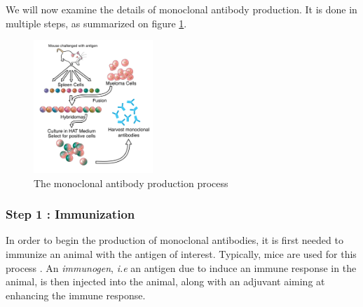 We will now examine the details of monoclonal antibody production.
It is done in multiple steps, as summarized on figure \ref{fig:Monoclonal_Antibody_Production}.

\begin{figure}[H]
    \begin{center}
        \includegraphics[width=0.4\textwidth]{../Images/mab_hybridomas.png}
        \caption{The monoclonal antibody production process}
        \label{fig:Monoclonal_Antibody_Production}
    \end{center}
\end{figure}


\subsubsection{Step 1 : Immunization}

In order to begin the production of monoclonal antibodies, it is first
needed to immunize an animal with the antigen of interest. Typically, 
mice are used for this process \cite{leenaars_critical_2005}. 
An \emph{immunogen}, \textit{i.e} an antigen due to induce an immune response
in the animal, is then injected into the animal, along with an adjuvant
aiming at enhancing the immune response.

